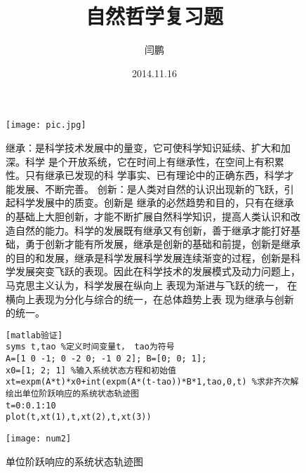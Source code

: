 \documentclass[a4paper]{article}
\begin{document}
\title{自然哲学复习题}
\author{闫鹏}
\date{2014.11.16}
\maketitle

\begin{figure}[htbp]
\begin{minipage}[c]{0.48\textwidth}
\texttt{[image: pic.jpg]}
\centering
\end{minipage} %
\begin{minipage}[c]{0.5\textwidth}
继承：是科学技术发展中的量变，它可使科学知识延续、扩大和加深。科学 是个开放系统，它在时间上有继承性，在空间上有积累性。只有继承已发现的科 学事实、已有理论中的正确东西，科学才能发展、不断完善。 创新：是人类对自然的认识出现新的飞跃，引起科学发展中的质变。创新是 继承的必然趋势和目的，只有在继承的基础上大胆创新，才能不断扩展自然科学知识，提高人类认识和改造自然的能力。科学的发展既有继承又有创新，善于继承才能打好基础，勇于创新才能有所发展，继承是创新的基础和前提，创新是继承的目的和发展，继承是科学发展科学发展连续渐变的过程，创新是科学发展突变飞跃的表现。因此在科学技术的发展模式及动力问题上，马克思主义认为，科学发展在纵向上 表现为渐进与飞跃的统一， 在横向上表现为分化与综合的统一，在总体趋势上表 现为继承与创新的统一。 
\end{minipage}
\end{figure}


\begin{figure}[htbp]
\begin{minipage}[c]{0.45\textwidth}
\begin{verbatim}[matlab验证]
syms t,tao %定义时间变量t， tao为符号
A=[1 0 -1; 0 -2 0; -1 0 2]; B=[0; 0; 1];
x0=[1; 2; 1] %输入系统状态方程和初始值
xt=expm(A*t)*x0+int(expm(A*(t-tao))*B*1,tao,0,t) %求非齐次解
绘出单位阶跃响应的系统状态轨迹图
t=0:0.1:10
plot(t,xt(1),t,xt(2),t,xt(3))
\end{verbatim}
\end{minipage}
\begin{minipage}[c]{0.5\textwidth}
\caption{单位阶跃响应的系统状态轨迹图}
\texttt{[image: num2]} 
\end{minipage}
\end{figure}
\end{document}
